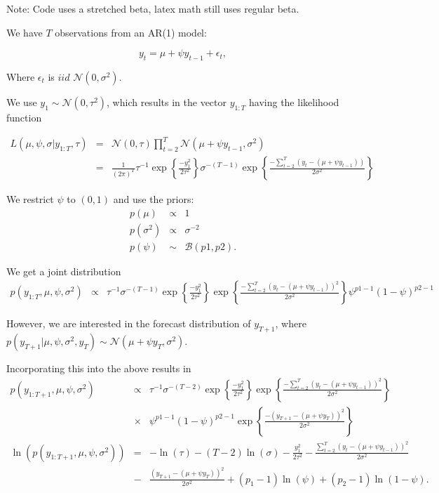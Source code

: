 \documentclass{article}
\begin{document}


Note: Code uses a stretched beta, latex math still uses regular beta.

We have $T$ observations from an AR(1) model:

$$y_{t} = \mu + \psi y_{t-1}+ \epsilon_{t},$$

Where $\epsilon_{t}$ is $iid \hspace{4pt} \mathcal{N}(0,\sigma^2).$

We use $y_1 \sim \mathcal{N}(0, \tau^2)$, which results in the vector $y_{1:T}$ having the likelihood function

\begin{eqnarray*}
\label{likelihood}
L(\mu, \psi, \sigma | y_{1:T}, \tau) & = & \mathcal{N}(0, \tau) \prod_{t=2}^{T} \mathcal{N}(\mu + \psi y_{t-1}, \sigma^2) \nonumber \\
& = & \frac{1}{(2\pi)^T} \tau^{-1} \exp \left\{ \frac{-y_1^2}{2\tau^2}\right\} \sigma^{-(T-1)} \exp \left\{ \frac{-\sum^{T}_{t=2}(y_t-(\mu+\psi y_{t-1}))}{2\sigma^2}\right\}  
\end{eqnarray*}

We restrict $\psi$ to $(0, 1)$ and use the priors:
\begin{eqnarray*}
\label{priors}
p(\mu) & \propto & 1 \\
p(\sigma^2) & \propto & \sigma^{-2} \\
p(\psi) & \sim & \mathcal{B}(p1, p2).
\end{eqnarray*}



We get a joint distribution
\begin{eqnarray*}
\label{joint}
p(y_{1:T}, \mu, \psi, \sigma^2) & \propto &  \tau^{-1} \sigma^{-(T-1)}  \exp \left\{ \frac{-y_1^2}{2\tau^2}\right\} \exp \left\{ \frac{-\sum^{T}_{t=2}(y_t-(\mu+\psi y_{t-1}))^2}{2\sigma^2}\right\} \psi^{p1-1}(1-\psi)^{p2-1}
\end{eqnarray*}

However, we are interested in the forecast distribution of $y_{T+1}$, where $p(y_{T+1} | \mu, \psi, \sigma^2, y_T) \sim \mathcal{N}(\mu + \psi y_T, \sigma^2).$

Incorporating this into the above results in
\begin{eqnarray*}
\label{jointpred}
p(y_{1:T+1}, \mu, \psi, \sigma^2) & \propto &  \tau^{-1} \sigma^{-(T-2)}  \exp \left\{ \frac{-y_1^2}{2\tau^2}\right\} \exp \left\{ \frac{-\sum^{T}_{t=2}(y_t-(\mu+\psi y_{t-1}))^2}{2\sigma^2}\right\} \\
& \times &  \psi^{p1-1}(1-\psi)^{p2-1} \exp \left\{ \frac{-(y_{T+1}-(\mu+\psi y_T))^2}{2\sigma^2} \right\} \\
\ln(p(y_{1:T+1}, \mu, \psi, \sigma^2)) & = & -\ln(\tau) - (T-2) \ln(\sigma) - \frac{y_1^2}{2\tau^2} - \frac{\sum^{T}_{t=2}(y_t-(\mu+\psi y_{t-1}))^2}{2\sigma^2} \\
& - &  \frac{(y_{T+1}-(\mu+\psi y_T))^2}{2\sigma^2} + (p_1-1) \ln(\psi) + (p_2-1)\ln(1-\psi).
\end{eqnarray*}
\end{document}
